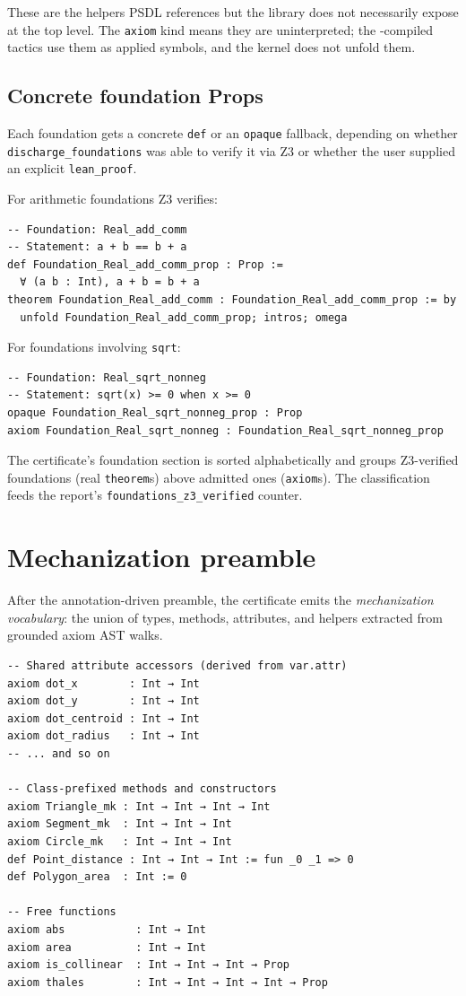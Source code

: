 These are the helpers PSDL references but the library does not
necessarily expose at the top level.  The \texttt{axiom} kind means
they are uninterpreted; the \PSDL-compiled tactics use them as
applied symbols, and the kernel does not unfold them.

\subsection{Concrete foundation Props}

Each foundation gets a concrete \texttt{def} or an \texttt{opaque}
fallback, depending on whether \texttt{discharge\_foundations} was
able to verify it via Z3 or whether the user supplied an explicit
\texttt{lean\_proof}.

For arithmetic foundations Z3 verifies:
\begin{lstlisting}[language=lean4]
-- Foundation: Real_add_comm
-- Statement: a + b == b + a
def Foundation_Real_add_comm_prop : Prop :=
  ∀ (a b : Int), a + b = b + a
theorem Foundation_Real_add_comm : Foundation_Real_add_comm_prop := by
  unfold Foundation_Real_add_comm_prop; intros; omega
\end{lstlisting}

For foundations involving \texttt{sqrt}:
\begin{lstlisting}[language=lean4]
-- Foundation: Real_sqrt_nonneg
-- Statement: sqrt(x) >= 0 when x >= 0
opaque Foundation_Real_sqrt_nonneg_prop : Prop
axiom Foundation_Real_sqrt_nonneg : Foundation_Real_sqrt_nonneg_prop
\end{lstlisting}

The certificate's foundation section is sorted alphabetically and
groups Z3-verified foundations (real \texttt{theorem}s) above
admitted ones (\texttt{axiom}s).  The classification feeds the
report's \texttt{foundations\_z3\_verified} counter.

\section{Mechanization preamble}
\label{sec:mechanization-preamble}

After the annotation-driven preamble, the certificate emits the
\emph{mechanization vocabulary}: the union of types, methods,
attributes, and helpers extracted from grounded axiom AST walks.

\begin{lstlisting}[language=lean4]
-- Shared attribute accessors (derived from var.attr)
axiom dot_x        : Int → Int
axiom dot_y        : Int → Int
axiom dot_centroid : Int → Int
axiom dot_radius   : Int → Int
-- ... and so on

-- Class-prefixed methods and constructors
axiom Triangle_mk : Int → Int → Int → Int
axiom Segment_mk  : Int → Int → Int
axiom Circle_mk   : Int → Int → Int
def Point_distance : Int → Int → Int := fun _0 _1 => 0
def Polygon_area  : Int := 0

-- Free functions
axiom abs           : Int → Int
axiom area          : Int → Int
axiom is_collinear  : Int → Int → Int → Prop
axiom thales        : Int → Int → Int → Int → Prop
\end{lstlisting}

